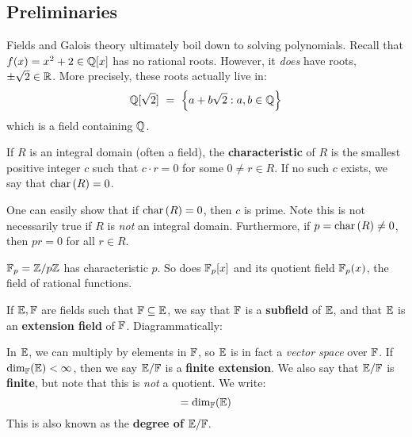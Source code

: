 \subsection{Preliminaries}

Fields and Galois theory ultimately boil down to solving polynomials.
Recall that $ f(x) = x^{2} + 2 \in \mathbb{Q}[x] $ has no rational roots.
However, it \textit{does} have roots, $ \pm\sqrt{2} \in \mathbb{R} $.
More precisely, these roots actually live in:
\begin{equation*}
    \mathbb{Q}[\sqrt{2}] \ = \ \left\{{a+b\sqrt{2} : a,b \in \mathbb{Q}}\right\}
\end{equation*}
which is a field containing $ \mathbb{Q} $.

\begin{defn}
    If $ R $ is an integral domain (often a field), the \textbf{characteristic}
    of $ R $ is the smallest positive integer $ c $ such that $ c \cdot r = 0 $
    for some $ 0 \neq r \in R $. \vsp
    If no such $ c $ exists, we say that $ \operatorname{char\,}(R) = 0 $.
\end{defn}

One can easily show that if $ \operatorname{char\,}(R) = 0 $, then $ c $ is prime.
Note this is not necessarily true if $ R $ is \textit{not} an integral domain.
Furthermore, if $ p = \operatorname{char\,}(R) \neq 0 $, then $ pr = 0 $ for all $ r \in R $.

\begin{xmp}[source=Primary Source Material]
    $ \mathbb{F}_{p} = \mathbb{Z}/p\mathbb{Z} $ has characteristic $ p $.
    So does $ \mathbb{F}_{p}[x] $ and its quotient field $ \mathbb{F}_{p}(x) $, the
    field of rational functions.
\end{xmp}

If $ \mathbb{E}, \mathbb{F} $ are fields such that $ \mathbb{F} \subseteq \mathbb{E} $, we say
that $ \mathbb{F} $ is a \textbf{subfield} of $ \mathbb{E} $, and that $ \mathbb{E} $ is an
\textbf{extension field} of $ \mathbb{F} $. Diagrammatically:


\centering
{}
\flushleft


In $ \mathbb{E} $, we can multiply by elements in $ \mathbb{F} $, so $ \mathbb{E} $ is in
fact a \textit{vector space} over $ \mathbb{F} $.
If $ \dim_{\mathbb{F}}(\mathbb{E}) < \infty $, then we say $ \mathbb{E}/\mathbb{F} $ is a
\textbf{finite extension}. We also say that $ \mathbb{E}/\mathbb{F} $ is \textbf{finite},
but note that this is \textit{not} a quotient. We write:
\begin{equation*}
    [\bb{E}:\bb{F}] = \dim_{\bb{F}}(\bb{E})
\end{equation*}
This is also known as the \textbf{degree of} $ \mathbb{E}/\mathbb{F} $.

